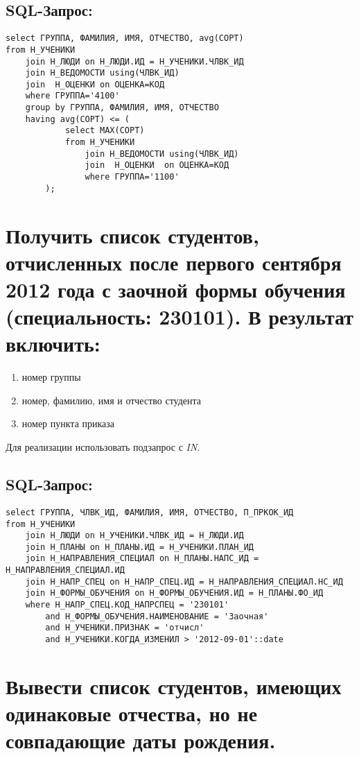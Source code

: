 \subsection{SQL-Запрос:}
\begin{verbatim}
select ГРУППА, ФАМИЛИЯ, ИМЯ, ОТЧЕСТВО, avg(СОРТ)
from Н_УЧЕНИКИ
    join Н_ЛЮДИ on Н_ЛЮДИ.ИД = Н_УЧЕНИКИ.ЧЛВК_ИД
    join Н_ВЕДОМОСТИ using(ЧЛВК_ИД)
    join  Н_ОЦЕНКИ on ОЦЕНКА=КОД
    where ГРУППА='4100'
    group by ГРУППА, ФАМИЛИЯ, ИМЯ, ОТЧЕСТВО
    having avg(СОРТ) <= (
            select MAX(СОРТ)
            from Н_УЧЕНИКИ
                join Н_ВЕДОМОСТИ using(ЧЛВК_ИД)
                join  Н_ОЦЕНКИ  on ОЦЕНКА=КОД
                where ГРУППА='1100'
        );
\end{verbatim}

\newpage
\section{Получить список студентов, отчисленных после первого сентября 2012 года с заочной формы обучения (специальность: 230101). В результат включить:}
\begin{enumerate}
	\item номер группы
	\item номер, фамилию, имя и отчество студента
	\item номер пункта приказа
\end{enumerate}

Для реализации использовать подзапрос с \textit{IN}.

\subsection{SQL-Запрос:}
\begin{verbatim}
select ГРУППА, ЧЛВК_ИД, ФАМИЛИЯ, ИМЯ, ОТЧЕСТВО, П_ПРКОК_ИД
from Н_УЧЕНИКИ
    join Н_ЛЮДИ on Н_УЧЕНИКИ.ЧЛВК_ИД = Н_ЛЮДИ.ИД
    join Н_ПЛАНЫ on Н_ПЛАНЫ.ИД = Н_УЧЕНИКИ.ПЛАН_ИД
    join Н_НАПРАВЛЕНИЯ_СПЕЦИАЛ on Н_ПЛАНЫ.НАПС_ИД = Н_НАПРАВЛЕНИЯ_СПЕЦИАЛ.ИД
    join Н_НАПР_СПЕЦ on Н_НАПР_СПЕЦ.ИД = Н_НАПРАВЛЕНИЯ_СПЕЦИАЛ.НС_ИД
    join Н_ФОРМЫ_ОБУЧЕНИЯ on Н_ФОРМЫ_ОБУЧЕНИЯ.ИД = Н_ПЛАНЫ.ФО_ИД
    where Н_НАПР_СПЕЦ.КОД_НАПРСПЕЦ = '230101'
        and Н_ФОРМЫ_ОБУЧЕНИЯ.НАИМЕНОВАНИЕ = 'Заочная'
        and Н_УЧЕНИКИ.ПРИЗНАК = 'отчисл'
        and Н_УЧЕНИКИ.КОГДА_ИЗМЕНИЛ > '2012-09-01'::date
\end{verbatim}

\newpage
\section{Вывести список студентов, имеющих одинаковые отчества, но не совпадающие даты рождения.}

